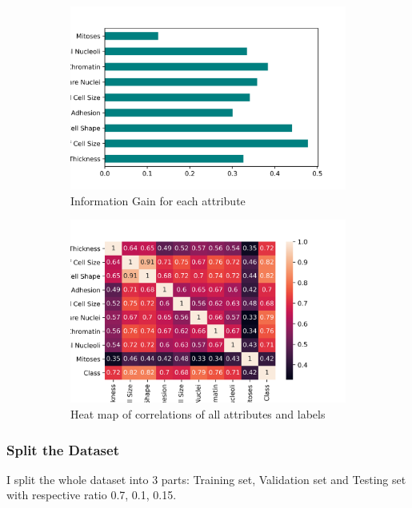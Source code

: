 \documentclass[a4paper]{article}
\begin{document}
\begin{figure}[h]
     \centering
     \begin{subfigure}[b]{0.45\textwidth}
         \centering
         \includegraphics[width=\textwidth]{Information_gain.png}
         
         \caption{Information Gain for each attribute}
         \label{2}
     \end{subfigure}
     \hfill
     \begin{subfigure}[b]{0.45\textwidth}
         \centering
         \includegraphics[width=\textwidth]{heatmap.png}
         \caption{Heat map of correlations of all attributes and labels}
         \label{3}
     \end{subfigure}
     \caption{}
\end{figure}
\subsubsection*{Split the Dataset}
I split the whole dataset into 3 parts: Training set, Validation set and Testing set with respective ratio 0.7, 0.1, 0.15.
\end{document}
